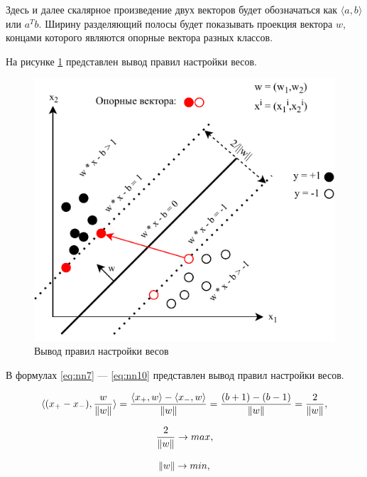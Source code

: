 Здесь и далее скалярное произведение двух векторов будет обозначаться как $\langle a,b\rangle$ или $a^Tb$. Ширину разделяющий полосы будет показывать проекция вектора $w$, концами которого являются опорные вектора разных классов.

На рисунке \ref{fig:svm2} представлен вывод правил настройки весов.

\begin{figure}[H]
	\centering
	\includegraphics[width=\textwidth]{../img/svm2.pdf}
	\caption{Вывод правил настройки весов}
	\label{fig:svm2}
\end{figure}

В формулах \ref{eq:nn7} --- \ref{eq:nn10} представлен вывод правил настройки весов.

\begin{equation}
	\label{eq:nn7}
	\langle(x_+-x_-),\frac{w}{\Arrowvert w\Arrowvert}\rangle = \frac{\langle x_+,w\rangle - \langle x_-,w\rangle}{\Arrowvert w\Arrowvert} = \frac{(b+1)-(b-1)}{\Arrowvert w\Arrowvert} = \frac{2}{\Arrowvert w\Arrowvert},
\end{equation}

\begin{equation}
	\label{eq:nn8}
	\frac{2}{\Arrowvert w\Arrowvert} \rightarrow max,
\end{equation}

\begin{equation}
	\label{eq:nn9}
	\Arrowvert w\Arrowvert \rightarrow min,
\end{equation}


